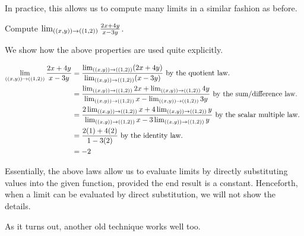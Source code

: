 \documentclass{ximera}
\begin{document}
In practice, this allows us to compute many limits in a similar fashion as before.

\begin{example}
Compute $\lim_{\left(\left(x,y\right)\right) \to \left(\left(1,2\right)\right)} \frac{2x+4y}{x-3y}$.  

\begin{explanation}
We show how the above properties are used quite explicitly.

\begin{align*}
\lim_{\left(\left(x,y\right)\right) \to \left(\left(1,2\right)\right)} \frac{2x+4y}{x-3y} & = \frac{\lim_{\left(\left(x,y\right)\right) \to \left(\left(1,2\right)\right)}(2x+4y)}{\lim_{\left(\left(x,y\right)\right) \to \left(\left(1,2\right)\right)}(x-3y)} \textrm{ by the quotient law. } \\
&=  \frac{\lim_{\left(\left(x,y\right)\right) \to \left(\left(1,2\right)\right)}2x+\lim_{\left(\left(x,y\right)\right) \to \left(\left(1,2\right)\right)} 4y}{\lim_{\left(\left(x,y\right)\right) \to \left(\left(1,2\right)\right)}x-\lim_{\left(\left(x,y\right)\right) \to \left(\left(1,2\right)\right)}3y}  \textrm{ by the sum/difference law. } \\
&=  \frac{2\lim_{\left(\left(x,y\right)\right) \to \left(\left(1,2\right)\right)}x+4\lim_{\left(\left(x,y\right)\right) \to \left(\left(1,2\right)\right)} y}{\lim_{\left(\left(x,y\right)\right) \to \left(\left(1,2\right)\right)}x-3\lim_{\left(\left(x,y\right)\right) \to \left(\left(1,2\right)\right)}y}  \textrm{ by the scalar multiple law. } \\
&= \frac{2(1)+4(2)}{1-3(2)} \textrm{ by the identity law. } \\
&= -2
\end{align*}
\end{explanation}
\end{example}

Essentially, the above laws allow us to evaluate limits by directly substituting values into the given function, provided the end result is a constant.  Henceforth, when a limit can be evaluated by direct substitution, we will not show the details.  

As it turns out, another old technique works well too.
\end{document}

